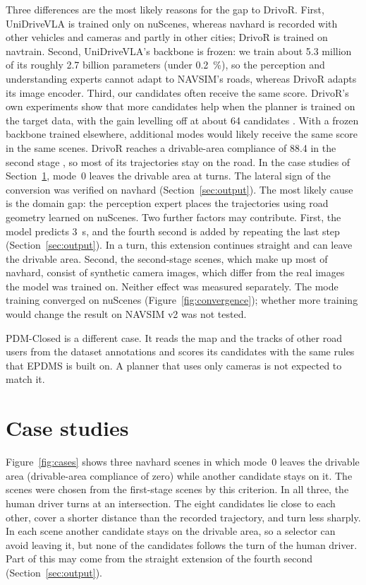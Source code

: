 \documentclass[11pt, a4paper, oneside]{book}
\begin{document}
Three differences are the most likely reasons for the gap to DrivoR. First, UniDriveVLA is trained only on nuScenes,
whereas navhard is recorded with other vehicles and cameras and partly in other cities; DrivoR
is trained on navtrain. Second, UniDriveVLA's backbone is frozen: we train about \num{5.3}
million of its roughly \num{2.7} billion parameters (under \SI{0.2}{\percent}), so the
perception and understanding experts cannot adapt to NAVSIM's roads, whereas DrivoR adapts its
image encoder. Third, our candidates often receive the same score. DrivoR's own experiments show that
more candidates help when the planner is trained on the target data, with the gain levelling off
at about 64 candidates \cite{drivor}. With a frozen backbone trained elsewhere, additional modes
would likely receive the same score in the same scenes. DrivoR reaches a drivable-area compliance of \num{88.4} in
the second stage \cite{drivor}, so most of its trajectories stay on the road. In the case studies of
Section~\ref{sec:cases}, mode~0 leaves the drivable area at turns. The lateral sign of the
conversion was verified on navhard (Section~\ref{sec:output}). The most likely cause is the
domain gap: the perception expert places the trajectories using road geometry learned on
nuScenes. Two further factors may contribute. First, the model predicts \SI{3}{\second}, and
the fourth second is added by repeating the last step (Section~\ref{sec:output}). In a turn,
this extension continues straight and can leave the drivable area. Second, the second-stage
scenes, which make up most of navhard, consist of synthetic camera images, which differ from
the real images the model was trained on. Neither effect was measured separately. The mode
training converged on nuScenes (Figure~\ref{fig:convergence}); whether more training would
change the result on NAVSIM v2 was not tested.

PDM-Closed is a different case. It reads the map and the tracks of other road users from the
dataset annotations and scores its candidates with the same rules that EPDMS is built on. A
planner that uses only cameras is not expected to match it.

\section{Case studies}
\label{sec:cases}
Figure~\ref{fig:cases} shows three navhard scenes in which mode~0 leaves the drivable area
(drivable-area compliance of zero) while another candidate stays on it. The scenes were chosen
from the first-stage scenes by this criterion. In all three, the human driver turns at an
intersection. The eight candidates lie close to each other, cover a shorter distance than the
recorded trajectory, and turn less sharply. In each scene another candidate stays on the
drivable area, so a selector can avoid leaving it, but none of the candidates follows the turn
of the human driver. Part of this may come from the straight extension of the fourth second
(Section~\ref{sec:output}).
\end{document}

